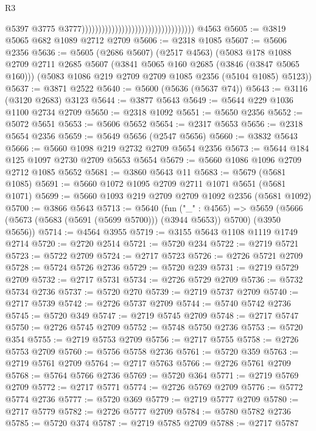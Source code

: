 \begin{lexlean}{R3}
\begin{coremodule}
                                                                        @5397
                                                                        @3775
                                                                        @3777))))))))))))))))))))))))))))))))))
    @4563
@5605 := @3819 @5065 @682 @1089 @2712 @2709
@5606 := @2318 @1085
@5607 := @5606 @2356
@5636 := @5605
    (@2686 @5607)
    (@2517 @4563)
    (@5083
      @178
      @1088
      @2709
      @2711
      @2685
      @5607
      (@3841 @5065 @160 @2685 (@3846 (@3847 @5065 @160)))
      (@5083 @1086 @219 @2709 @2709 @1085 @2356 (@5104 @1085) @5123))
@5637 := @3871 @2522
@5640 := @5600 (@5636 (@5637 @74))
@5643 := @3116 (@3120 @2683) @3123
@5644 := @3877 @5643
@5649 := @5644 @229 @1036 @1100 @2734 @2709
@5650 := @2318 @1092
@5651 := @5650 @2356
@5652 := @5072 @5651
@5653 := @5606 @5652
@5654 := @2317 @5653
@5656 := @2318 @5654 @2356
@5659 := @5649 @5656 (@2547 @5656)
@5660 := @3832 @5643
@5666 := @5660 @1098 @219 @2732 @2709 @5654 @2356
@5673 := @5644 @184 @125 @1097 @2730 @2709 @5653 @5654
@5679 := @5660 @1086 @1096 @2709 @2712 @1085 @5652
@5681 := @3860 @5643 @11
@5683 := @5679 (@5681 @1085)
@5691 := @5660 @1072 @1095 @2709 @2711 @1071 @5651 (@5681 @1071)
@5699 := @5660 @1093 @219 @2709 @2709 @1092 @2356 (@5681 @1092)
@5700 := @3866 @5643
@5713 := @5640
    (fun ("_" : @4565) =>
    @5659 (@5666 (@5673 (@5683 (@5691 (@5699 @5700))) (@3944 @5653)) @5700) (@3950 @5656))
@5714 := @4564 @3955
@5719 := @3155 @5643 @1108 @1119 @1749 @2714
@5720 := @2720 @2514
@5721 := @5720 @234
@5722 := @2719 @5721
@5723 := @5722 @2709
@5724 := @2717 @5723
@5726 := @2726 @5721 @2709
@5728 := @5724 @5726 @2736
@5729 := @5720 @239
@5731 := @2719 @5729 @2709
@5732 := @2717 @5731
@5734 := @2726 @5729 @2709
@5736 := @5732 @5734 @2736
@5737 := @5720 @270
@5739 := @2719 @5737 @2709
@5740 := @2717 @5739
@5742 := @2726 @5737 @2709
@5744 := @5740 @5742 @2736
@5745 := @5720 @349
@5747 := @2719 @5745 @2709
@5748 := @2717 @5747
@5750 := @2726 @5745 @2709
@5752 := @5748 @5750 @2736
@5753 := @5720 @354
@5755 := @2719 @5753 @2709
@5756 := @2717 @5755
@5758 := @2726 @5753 @2709
@5760 := @5756 @5758 @2736
@5761 := @5720 @359
@5763 := @2719 @5761 @2709
@5764 := @2717 @5763
@5766 := @2726 @5761 @2709
@5768 := @5764 @5766 @2736
@5769 := @5720 @364
@5771 := @2719 @5769 @2709
@5772 := @2717 @5771
@5774 := @2726 @5769 @2709
@5776 := @5772 @5774 @2736
@5777 := @5720 @369
@5779 := @2719 @5777 @2709
@5780 := @2717 @5779
@5782 := @2726 @5777 @2709
@5784 := @5780 @5782 @2736
@5785 := @5720 @374
@5787 := @2719 @5785 @2709
@5788 := @2717 @5787

\end{coremodule}
\end{lexlean}
